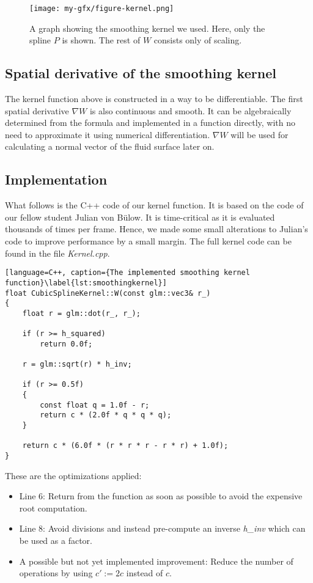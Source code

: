 \begin{figure}[h]
    \centering
    \texttt{[image: my-gfx/figure-kernel.png]}
    \caption{A graph showing the smoothing kernel we used. Here, only the spline $P$ is shown. The rest of $W$ consists only of scaling.}
    \label{fig:kernel}
\end{figure}


\subsection{Spatial derivative of the smoothing kernel}

The kernel function above is constructed in a way to be differentiable. The first spatial derivative $\nabla W$ is also continuous and smooth. It can be algebraically determined from the formula and implemented in a function directly, with no need to approximate it using numerical differentiation. $\nabla W$ will be used for calculating a normal vector of the fluid surface later on.

\subsection{Implementation}

What follows is the C++ code of our kernel function. It is based on the code of our fellow student Julian von Bülow. It is time-critical as it is evaluated thousands of times per frame. Hence, we made some small alterations to Julian's code to improve performance by a small margin. The full kernel code can be found in the file \textit{Kernel.cpp}.

\begin{lstlisting}[language=C++, caption={The implemented smoothing kernel function}\label{lst:smoothingkernel}]
float CubicSplineKernel::W(const glm::vec3& r_)
{
	float r = glm::dot(r_, r_);

	if (r >= h_squared)
		return 0.0f;

	r = glm::sqrt(r) * h_inv;
	
	if (r >= 0.5f)
	{
		const float q = 1.0f - r;
		return c * (2.0f * q * q * q);
	}
	
	return c * (6.0f * (r * r * r - r * r) + 1.0f);
}
\end{lstlisting}

These are the optimizations applied:
\begin{itemize}
    \item Line 6: Return from the function as soon as possible to avoid the expensive root computation.
    \item Line 8: Avoid divisions and instead pre-compute an inverse \textit{h\_inv} which can be used as a factor.
    \item A possible but not yet implemented improvement: Reduce the number of operations by using $c' := 2c$ instead of $c$.
\end{itemize}

